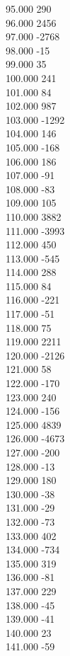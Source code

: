 { 95.000	290 \\
 96.000	2456 \\
 97.000	-2768 \\
 98.000	-15 \\
 99.000	35 \\
 100.000	241 \\
 101.000	84 \\
 102.000	987 \\
 103.000	-1292 \\
 104.000	146 \\
 105.000	-168 \\
 106.000	186 \\
 107.000	-91 \\
 108.000	-83 \\
 109.000	105 \\
 110.000	3882 \\
 111.000	-3993 \\
 112.000	450 \\
 113.000	-545 \\
 114.000	288 \\
 115.000	84 \\
 116.000	-221 \\
 117.000	-51 \\
 118.000	75 \\
 119.000	2211 \\
 120.000	-2126 \\
 121.000	58 \\
 122.000	-170 \\
 123.000	240 \\
 124.000	-156 \\
 125.000	4839 \\
 126.000	-4673 \\
 127.000	-200 \\
 128.000	-13 \\
 129.000	180 \\
 130.000	-38 \\
 131.000	-29 \\
 132.000	-73 \\
 133.000	402 \\
 134.000	-734 \\
 135.000	319 \\
 136.000	-81 \\
 137.000	229 \\
 138.000	-45 \\
 139.000	-41 \\
 140.000	23 \\
 141.000	-59 \\
}
